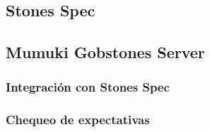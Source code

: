 \subsection{Stones Spec}

\subsection{Mumuki Gobstones Server}
\subsubsection{Integración con Stones Spec}
\subsubsection{Chequeo de expectativas}
